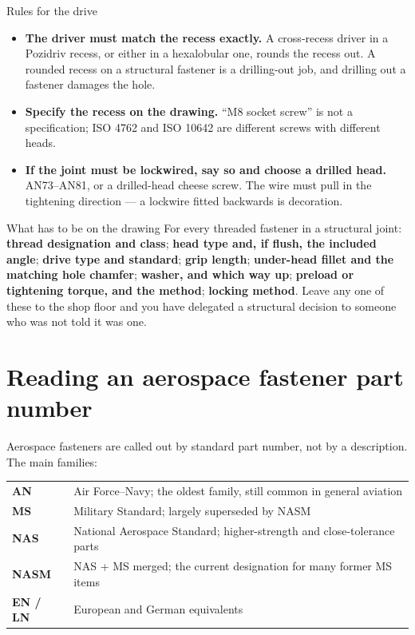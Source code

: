 \documentclass[11pt,a4paper]{article}
\begin{document}
\begin{keybox}{Rules for the drive}
\begin{itemize}[leftmargin=*,itemsep=1pt]
\item \textbf{The driver must match the recess exactly.} A cross-recess driver in a Pozidriv
  recess, or either in a hexalobular one, rounds the recess out. A rounded recess on a structural
  fastener is a drilling-out job, and drilling out a fastener damages the hole.
\item \textbf{Specify the recess on the drawing.} ``M8 socket screw'' is not a specification;
  ISO 4762 and ISO 10642 are different screws with different heads.
\item \textbf{If the joint must be lockwired, say so and choose a drilled head.} AN73--AN81, or a
  drilled-head cheese screw. The wire must pull in the tightening direction --- a lockwire fitted
  backwards is decoration.
\end{itemize}
\end{keybox}

\begin{keybox}{What has to be on the drawing}
For every threaded fastener in a structural joint:
\textbf{thread designation and class}; \textbf{head type and, if flush, the included angle};
\textbf{drive type and standard}; \textbf{grip length}; \textbf{under-head fillet and the matching
hole chamfer}; \textbf{washer, and which way up}; \textbf{preload or tightening torque, and the
method}; \textbf{locking method}. Leave any one of these to the shop floor and you have delegated
a structural decision to someone who was not told it was one.
\end{keybox}

\section{Reading an aerospace fastener part number}

Aerospace fasteners are called out by standard part number, not by a description. The main families:

\begin{center}\small
\begin{tabular}{@{}ll@{}}
\toprule
\textbf{AN} & Air Force--Navy; the oldest family, still common in general aviation\\
\textbf{MS} & Military Standard; largely superseded by NASM\\
\textbf{NAS} & National Aerospace Standard; higher-strength and close-tolerance parts\\
\textbf{NASM} & NAS + MS merged; the current designation for many former MS items\\
\textbf{EN / LN} & European and German equivalents\\
\bottomrule
\end{tabular}
\end{center}
\end{document}
